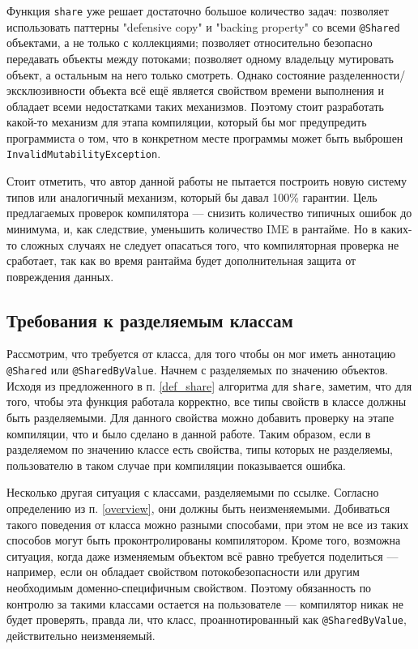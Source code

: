 \documentclass[specification,annotation,times]{itmo-student-thesis}
\begin{document}
Функция \texttt{share} уже решает достаточно большое количество задач: позволяет использовать паттерны "defensive copy" и "backing property" со всеми \texttt{@Shared} объектами, а не только с коллекциями; позволяет относительно безопасно передавать объекты между потоками; позволяет одному владельцу мутировать объект, а остальным на него только смотреть.
Однако состояние разделенности/эксклюзивности объекта всё ещё является свойством времени выполнения и обладает всеми недостатками таких механизмов. 
Поэтому стоит разработать какой-то механизм для этапа компиляции, который бы мог предупредить программиста о том, что в конкретном месте программы может быть выброшен \texttt{InvalidMutabilityException}.

Стоит отметить, что автор данной работы не пытается построить новую систему типов или аналогичный механизм, который бы давал 100\% гарантии.
Цель предлагаемых проверок компилятора --- снизить количество типичных ошибок до минимума, и, как следствие, уменьшить количество IME в рантайме.
Но в каких-то сложных случаях не следует опасаться того, что компиляторная проверка не сработает,
так как во время рантайма будет дополнительная защита от повреждения данных.

\subsection{Требования к разделяемым классам}\label{shared_requirements}

Рассмотрим, что требуется от класса, для того чтобы он мог иметь аннотацию \texttt{@Shared} или \texttt{@SharedByValue}.
Начнем с разделяемых по значению объектов.
Исходя из предложенного в п. \ref{def_share} алгоритма для
\texttt{share}, заметим, что для того, чтобы эта функция работала корректно,
все типы свойств в классе должны быть разделяемыми.
Для данного свойства можно добавить проверку на этапе компиляции, что и было сделано в данной работе.
Таким образом, если в разделяемом  по значению классе есть свойства, типы которых не разделяемы, пользователю в таком случае при компиляции показывается ошибка.

Несколько другая ситуация с классами, разделяемыми по ссылке. Согласно определению из п. \ref{overview}, они должны быть неизменяемыми.
Добиваться такого поведения от класса можно разными способами, при этом не все из таких способов могут быть проконтролированы компилятором.
Кроме того, возможна ситуация, когда даже изменяемым объектом всё равно требуется поделиться --- например, если он обладает свойством потокобезопасности или другим необходимым доменно-специфичным свойством.
Поэтому обязанность по контролю за такими классами остается на пользователе --- компилятор никак не будет проверять, правда ли, что класс, проаннотированный как \texttt{@SharedByValue}, действительно неизменяемый.
\end{document}
